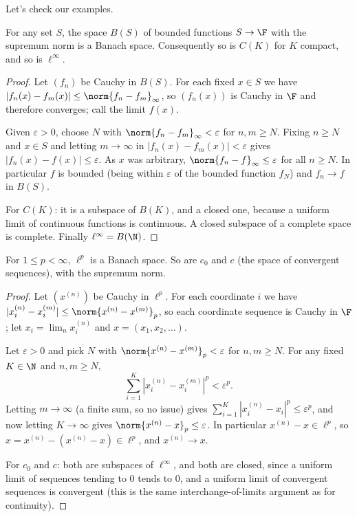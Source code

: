Let's check our examples.

\begin{proposition}
	For any set $S$, the space $B(S)$ of bounded functions $S \to \F$ with the supremum norm is a Banach space. Consequently so is $C(K)$ for $K$ compact, and so is $\ell^\infty$.
\end{proposition}

\begin{proof}
	Let $(f_n)$ be Cauchy in $B(S)$. For each fixed $x \in S$ we have $|f_n(x) - f_m(x)| \leq \norm{f_n - f_m}_\infty$, so $(f_n(x))$ is Cauchy in $\F$ and therefore converges; call the limit $f(x)$.

	Given $\varepsilon > 0$, choose $N$ with $\norm{f_n - f_m}_\infty < \varepsilon$ for $n, m \geq N$. Fixing $n \geq N$ and $x \in S$ and letting $m \to \infty$ in $|f_n(x) - f_m(x)| < \varepsilon$ gives $|f_n(x) - f(x)| \leq \varepsilon$. As $x$ was arbitrary, $\norm{f_n - f}_\infty \leq \varepsilon$ for all $n \geq N$. In particular $f$ is bounded (being within $\varepsilon$ of the bounded function $f_N$) and $f_n \to f$ in $B(S)$.

	For $C(K)$: it is a subspace of $B(K)$, and a closed one, because a uniform limit of continuous functions is continuous. A closed subspace of a complete space is complete. Finally $\ell^\infty = B(\N)$.
\end{proof}

\begin{proposition}
	For $1 \leq p < \infty$, $\ell^p$ is a Banach space. So are $c_0$ and $c$ (the space of convergent sequences), with the supremum norm.
\end{proposition}

\begin{proof}
	Let $(x^{(n)})$ be Cauchy in $\ell^p$. For each coordinate $i$ we have $|x_i^{(n)} - x_i^{(m)}| \leq \norm{x^{(n)} - x^{(m)}}_p$, so each coordinate sequence is Cauchy in $\F$; let $x_i = \lim_n x_i^{(n)}$ and $x = (x_1, x_2, \dots)$.

	Let $\varepsilon > 0$ and pick $N$ with $\norm{x^{(n)} - x^{(m)}}_p < \varepsilon$ for $n, m \geq N$. For any fixed $K \in \N$ and $n, m \geq N$,
	$$\sum_{i=1}^K |x_i^{(n)} - x_i^{(m)}|^p < \varepsilon^p.$$
	Letting $m \to \infty$ (a finite sum, so no issue) gives $\sum_{i=1}^K |x_i^{(n)} - x_i|^p \leq \varepsilon^p$, and now letting $K \to \infty$ gives $\norm{x^{(n)} - x}_p \leq \varepsilon$. In particular $x^{(n)} - x \in \ell^p$, so $x = x^{(n)} - (x^{(n)} - x) \in \ell^p$, and $x^{(n)} \to x$.

	For $c_0$ and $c$: both are subspaces of $\ell^\infty$, and both are closed, since a uniform limit of sequences tending to $0$ tends to $0$, and a uniform limit of convergent sequences is convergent (this is the same interchange-of-limits argument as for continuity).
\end{proof}

